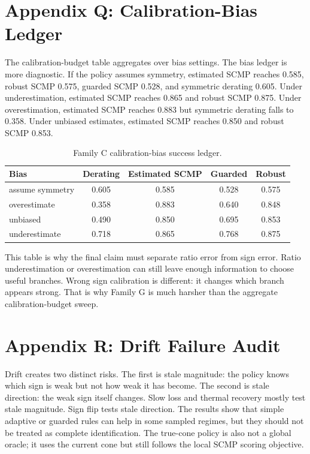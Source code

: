 \documentclass{article}
\begin{document}
\section{Appendix Q: Calibration-Bias Ledger}

The calibration-budget table aggregates over bias settings. The bias ledger is more diagnostic. If the policy assumes symmetry, estimated SCMP reaches 0.585, robust SCMP 0.575, guarded SCMP 0.528, and symmetric derating 0.605. Under underestimation, estimated SCMP reaches 0.865 and robust SCMP 0.875. Under overestimation, estimated SCMP reaches 0.883 but symmetric derating falls to 0.358. Under unbiased estimates, estimated SCMP reaches 0.850 and robust SCMP 0.853.

\begin{table}[t]
\centering
\footnotesize
\caption{Family C calibration-bias success ledger.}
\label{tab:bias-ledger}
\begin{tabular}{lcccc}
\toprule
Bias & Derating & Estimated SCMP & Guarded & Robust \\
\midrule
assume symmetry & 0.605 & 0.585 & 0.528 & 0.575 \\
overestimate & 0.358 & 0.883 & 0.640 & 0.848 \\
unbiased & 0.490 & 0.850 & 0.695 & 0.853 \\
underestimate & 0.718 & 0.865 & 0.768 & 0.875 \\
\bottomrule
\end{tabular}
\end{table}

This table is why the final claim must separate ratio error from sign error. Ratio underestimation or overestimation can still leave enough information to choose useful branches. Wrong sign calibration is different: it changes which branch appears strong. That is why Family G is much harsher than the aggregate calibration-budget sweep.

\section{Appendix R: Drift Failure Audit}

Drift creates two distinct risks. The first is stale magnitude: the policy knows which sign is weak but not how weak it has become. The second is stale direction: the weak sign itself changes. Slow loss and thermal recovery mostly test stale magnitude. Sign flip tests stale direction. The results show that simple adaptive or guarded rules can help in some sampled regimes, but they should not be treated as complete identification. The true-cone policy is also not a global oracle; it uses the current cone but still follows the local SCMP scoring objective.
\end{document}

